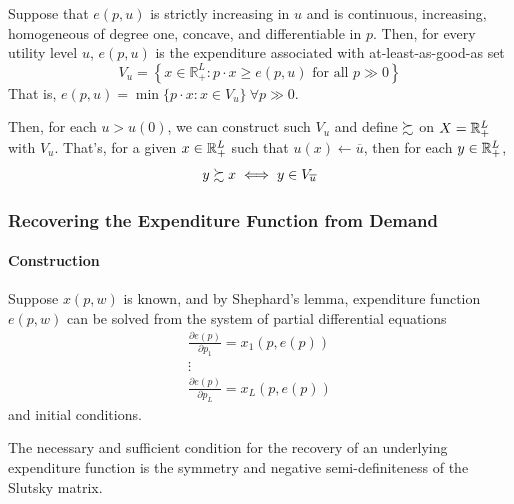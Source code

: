 \documentclass{article}
\begin{document}
 			\begin{proposition}[3.H.1]
 				Suppose that $e(p, u)$ is strictly increasing in $u$ and is continuous, increasing, homogeneous of degree one, concave, and differentiable in $p$. Then, for every utility level $u$, $e(p, u)$ is the expenditure associated with at-least-as-good-as set
 				\begin{equation}
 					V_{u}=\left\{x \in \mathbb{R}_{+}^{L} : p \cdot x \geq e(p, u) \text { for all } p \gg 0\right\}
 				\end{equation}
 				That is, $e(p, u) = \min\{p\cdot x: x \in V_u\}\ \forall p \gg 0$.
 			\end{proposition}
 			
 			\par Then, for each $u > u(0)$, we can construct such $V_u$ and define $\succsim$ on $X = \mathbb{R}^L_+$ with $V_u$. That's, for a given $x \in \mathbb{R}^L_+$ such that $u(x) \leftarrow \overline{u}$, then for each $y \in \mathbb{R}^L_+$,
 			\begin{equation}
 				y \succsim x \iff y \in V_{\overline{u}}
 			\end{equation}
 			
 			\subsubsection{Recovering the Expenditure Function from Demand}
 			\paragraph{Construction} Suppose $x(p, w)$ is known, and by Shephard's lemma, expenditure function $e(p, w)$ can be solved from the system of partial differential equations
 			\begin{equation}
 				\begin{array}{l}{\frac{\partial e(p)}{\partial p_{1}}=x_{1}(p, e(p))} \\ {\vdots} \\ {\frac{\partial e(p)}{\partial p_{L}}=x_{L}(p, e(p))}\end{array}
 			\end{equation}
 			and initial conditions.
 			
 			\begin{proposition}
 				The necessary and sufficient condition for the recovery of an underlying expenditure function is the symmetry and negative semi-definiteness of the Slutsky matrix.
 			\end{proposition}
 		
\end{document}
